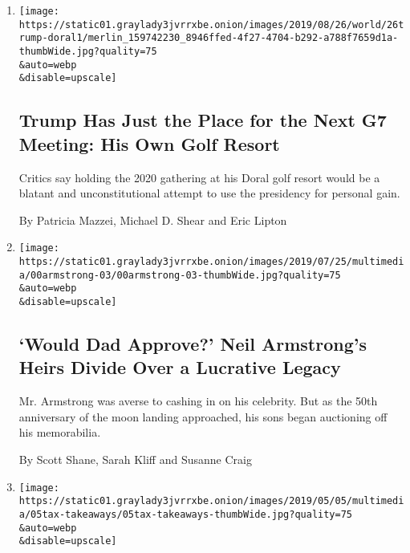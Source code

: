 \begin{enumerate}
\def\labelenumi{\arabic{enumi}.}
\item
  \href{/2019/08/26/world/europe/trump-doral-g7.html}{}

  \texttt{[image: https://static01.graylady3jvrrxbe.onion/images/2019/08/26/world/26trump-doral1/merlin\_159742230\_8946ffed-4f27-4704-b292-a788f7659d1a-thumbWide.jpg?quality=75\\\&auto=webp\\\&disable=upscale]}

  \hypertarget{trump-has-just-the-place-for-the-next-g7-meeting-his-own-golf-resort}{%
  \subsection{Trump Has Just the Place for the Next G7 Meeting: His Own
  Golf
  Resort}\label{trump-has-just-the-place-for-the-next-g7-meeting-his-own-golf-resort}}

  Critics say holding the 2020 gathering at his Doral golf resort would
  be a blatant and unconstitutional attempt to use the presidency for
  personal gain.

  By Patricia Mazzei, Michael D. Shear and Eric Lipton
\item
  \href{/2019/07/27/us/neil-armstrong-heirs.html}{}

  \texttt{[image: https://static01.graylady3jvrrxbe.onion/images/2019/07/25/multimedia/00armstrong-03/00armstrong-03-thumbWide.jpg?quality=75\\\&auto=webp\\\&disable=upscale]}

  \hypertarget{would-dad-approve-neil-armstrongs-heirs-divide-over-a-lucrative-legacy}{%
  \subsection{`Would Dad Approve?' Neil Armstrong's Heirs Divide Over a
  Lucrative
  Legacy}\label{would-dad-approve-neil-armstrongs-heirs-divide-over-a-lucrative-legacy}}

  Mr. Armstrong was averse to cashing in on his celebrity. But as the
  50th anniversary of the moon landing approached, his sons began
  auctioning off his memorabilia.

  By Scott Shane, Sarah Kliff and Susanne Craig
\item
  \href{/2019/05/07/us/trump-tax-figures.html}{}

  \texttt{[image: https://static01.graylady3jvrrxbe.onion/images/2019/05/05/multimedia/05tax-takeaways/05tax-takeaways-thumbWide.jpg?quality=75\\\&auto=webp\\\&disable=upscale]}


\end{enumerate}
